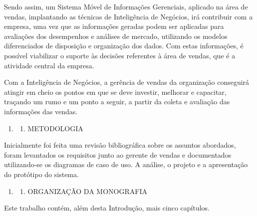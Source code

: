 \documentclass[a4paper]{article}
\newcounter{saveenum}
\newcommand\liststyleWWviiiNumi{%
\renewcommand\theenumi{\arabic{enumi}}
\renewcommand\theenumii{\arabic{enumi}.\arabic{enumii}}
\renewcommand\theenumiii{\arabic{enumi}.\arabic{enumii}.\arabic{enumiii}}
\renewcommand\theenumiv{\arabic{enumi}.\arabic{enumii}.\arabic{enumiii}.\arabic{enumiv}}
\renewcommand\labelenumi{\theenumi}
\renewcommand\labelenumii{\theenumii}
\renewcommand\labelenumiii{\theenumiii}
\renewcommand\labelenumiv{\theenumiv.}
}
\begin{document}
{
\textsf{Sendo assim, um Sistema M\'ovel de Informa\c{c}\~oes Gerenciais, aplicado na \'area de vendas, implantando as
t\'ecnicas de Intelig\^encia de Neg\'ocios, ir\'a contribuir com a empresa, uma vez que as informa\c{c}\~oes geradas
podem ser aplicadas para avalia\c{c}\~oes dos desempenhos e an\'alises de mercado, utilizando os modelos diferenciados
de disposi\c{c}\~ao e organiza\c{c}\~ao dos dados. Com estas informa\c{c}\~oes, \'e poss\'ivel viabilizar o suporte
\`as decis\~oes referentes \`a \'area de vendas, que \'e a atividade central da empresa.}}

{\sffamily
Com a Intelig\^encia de Neg\'ocios, a ger\^encia de vendas da organiza\c{c}\~ao conseguir\'a atingir em cheio os pontos
em que se deve investir, melhorar e capacitar, tra\c{c}ando um rumo e um ponto a seguir, a partir da coleta e
avalia\c{c}\~ao das informa\c{c}\~oes das vendas.}


\bigskip

\liststyleWWviiiNumi
\setcounter{saveenum}{\value{enumi}}
\begin{enumerate}
\setcounter{enumi}{\value{saveenum}}
\item \setcounter{saveenum}{\value{enumii}}
\begin{enumerate}
\setcounter{enumii}{\value{saveenum}}
\item {\sffamily
METODOLOGIA}
\end{enumerate}
\end{enumerate}
{
\textsf{Inicialmente foi feita uma revis\~ao bibliogr\'afica sobre os assuntos abordados, foram levantados os requisitos
junto ao gerente de vendas e documentados utilizando-se os diagramas de caso de uso. A an\'alise, o projeto e a
apresenta\c{c}\~ao do prot\'otipo do sistema.}}


\bigskip

\liststyleWWviiiNumi
\setcounter{saveenum}{\value{enumi}}
\begin{enumerate}
\setcounter{enumi}{\value{saveenum}}
\item \setcounter{saveenum}{\value{enumii}}
\begin{enumerate}
\setcounter{enumii}{\value{saveenum}}
\item {\sffamily
ORGANIZA\c{C}\~AO DA MONOGRAFIA}
\end{enumerate}
\end{enumerate}
{\sffamily
Este trabalho cont\'em, al\'em desta Introdu\c{c}\~ao, mais cinco cap\'itulos. }
\end{document}
